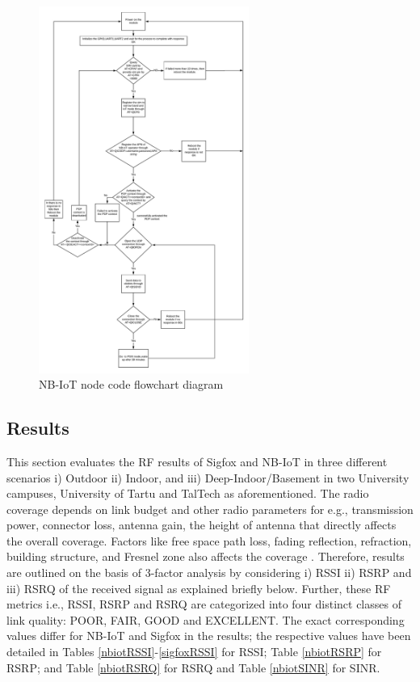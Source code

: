 \documentclass[12pt]{article}
\begin{document}
\begin{figure}[H]
    \centering
    \includegraphics[width=0.5\columnwidth,height=12cm]{nbiotFlowchart.pdf}
    \caption{NB-IoT node code flowchart diagram}
    \label{fig:NB-IoT node code flowchart diagram}
\end{figure}

\subsection{Results}\label{results}

This section evaluates the RF results of Sigfox and NB-IoT in three different scenarios i) Outdoor ii) Indoor, and iii) Deep-Indoor/Basement in two University campuses, University of Tartu and TalTech as aforementioned. The radio coverage depends on link budget and other radio parameters for e.g., transmission power, connector loss, antenna gain, the height of antenna that directly affects the overall coverage. Factors like free space path loss, fading reflection, refraction, building structure, and Fresnel zone also affects the coverage \cite{sikora2019test,sikora2019performance}. Therefore, results are outlined on the basis of 3-factor analysis by considering i) RSSI ii) RSRP and iii) RSRQ of the received signal as explained briefly below. Further, these RF metrics i.e., RSSI, RSRP and RSRQ are categorized into four distinct classes of link quality: POOR, FAIR, GOOD and EXCELLENT. The exact corresponding values differ for NB-IoT and Sigfox in the results; the respective values have been detailed in Tables \ref{nbiotRSSI}-\ref{sigfoxRSSI} for RSSI;  Table \ref{nbiotRSRP} for RSRP; and Table \ref{nbiotRSRQ} for RSRQ and Table \ref{nbiotSINR} for SINR.
\end{document}
